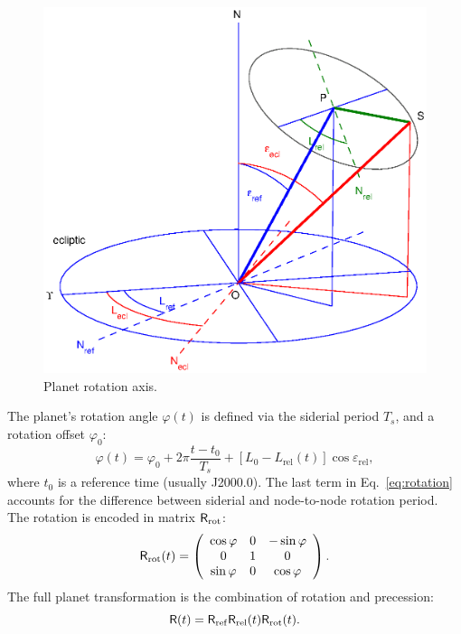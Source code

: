 \documentclass[a4paper]{article}
\newcommand{\mat}[1]{\ensuremath \mathsf{#1}}
\begin{document}
\begin{figure}[ht]
\includegraphics[width=\textwidth]{fig2.eps}
\caption{Planet rotation axis.}
\label{fig:prec_ecl}
\end{figure}
The planet's rotation angle $\varphi(t)$ is defined via the siderial period $T_s$, and a rotation offset $\varphi_0$:
\begin{equation}\label{eq:rotation}
\varphi(t) = \varphi_0 + 2\pi \frac{t-t_0}{T_s} + [L_0 - L_\mathrm{rel}(t)] \cos \varepsilon_\mathrm{rel},
\end{equation}
where $t_0$ is a reference time (usually J2000.0). The last term in Eq.~\ref{eq:rotation} accounts for the difference between siderial and node-to-node rotation period.
The rotation is encoded in matrix $\mat{R}_\mathrm{rot}$:
\begin{equation}
\mat{R}_\mathrm{rot}(t) = \left( \begin{array}{ccc}
\cos\varphi & 0 & -\sin\varphi \\
0 & 1 & 0 \\
\sin\varphi & 0 & \cos\varphi
\end{array} \right).
\end{equation}
The full planet transformation is the combination of rotation and precession:
\begin{equation}\label{eq:fullrot}
\mat{R}(t) = \mat{R}_\mathrm{ref} \mat{R}_\mathrm{rel}(t) \mat{R}_\mathrm{rot}(t).
\end{equation}
\end{document}

